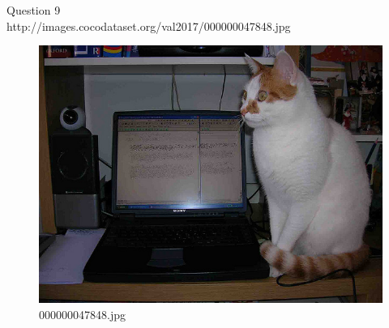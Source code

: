 Question 9\\
http://images.cocodataset.org/val2017/000000047848.jpg
    \begin{figure}[h]
        \centering
        \includegraphics[width=0.8\linewidth]{../image set/easy/000000047848.jpg}
        \caption{000000047848.jpg}
    \end{figure}
